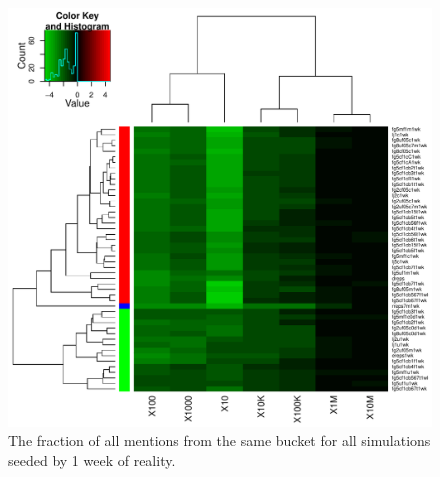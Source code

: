 \documentclass[10pt,oneside]{memoir}
\begin{document}
\begin{Spacing}{2}
\begin{figure}
\begin{center}
    \includegraphics{figures/crop/heatmap-b2bm-self-rel-medians-log10-1wk}
    \caption{The fraction of all mentions from the same bucket for all simulations seeded by 1 week of reality.}
    \label{figure:heatmap-b2bm-self-rel-medians-1wk}
\end{center}
\end{figure}


\end{Spacing}
\end{document}
